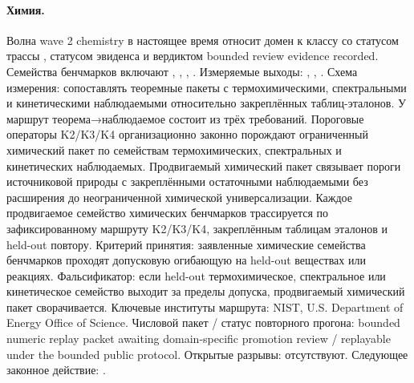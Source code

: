 \paragraph{Химия.}
Волна wave 2 chemistry в настоящее время относит домен к классу  со статусом трассы , статусом эвиденса  и вердиктом bounded review evidence recorded.
Семейства бенчмарков включают , \allowbreak {}, \allowbreak {}, \allowbreak {}.
Измеряемые выходы: , \allowbreak {}, \allowbreak {}.
Схема измерения: сопоставлять теоремные пакеты с термохимическими, спектральными и кинетическими наблюдаемыми относительно закреплённых таблиц-эталонов.
У маршрут теорема→наблюдаемое состоит из трёх требований. Пороговые операторы K2/K3/K4 организационно законно порождают ограниченный химический пакет по семействам термохимических, спектральных и кинетических наблюдаемых. Продвигаемый химический пакет связывает пороги источниковой природы с закреплёнными остаточными наблюдаемыми без расширения до неограниченной химической универсализации. Каждое продвигаемое семейство химических бенчмарков трассируется по зафиксированному маршруту K2/K3/K4, закреплённым таблицам эталонов и held-out повтору.
Критерий принятия: заявленные химические семейства бенчмарков проходят допусковую огибающую на held-out веществах или реакциях.
Фальсификатор: если held-out термохимическое, спектральное или кинетическое семейство выходит за пределы допуска, продвигаемый химический пакет сворачивается.
Ключевые институты маршрута: NIST, \allowbreak U.S. Department of Energy Office of Science.
Числовой пакет / статус повторного прогона: bounded numeric replay packet awaiting domain-specific promotion review / replayable under the bounded public protocol.
Открытые разрывы: отсутствуют.
Следующее законное действие: .

